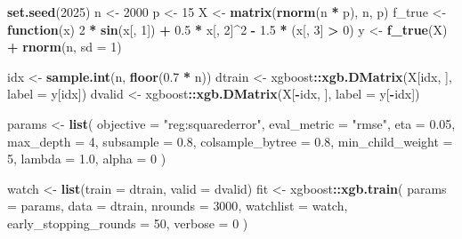 \documentclass[
]{book}
\newenvironment{Shaded}{\begin{snugshade}}{\end{snugshade}}
\newcommand{\AttributeTok}[1]{\textcolor[rgb]{0.13,0.29,0.53}{#1}}
\newcommand{\ControlFlowTok}[1]{\textcolor[rgb]{0.13,0.29,0.53}{\textbf{#1}}}
\newcommand{\DecValTok}[1]{\textcolor[rgb]{0.00,0.00,0.81}{#1}}
\newcommand{\FloatTok}[1]{\textcolor[rgb]{0.00,0.00,0.81}{#1}}
\newcommand{\FunctionTok}[1]{\textcolor[rgb]{0.13,0.29,0.53}{\textbf{#1}}}
\newcommand{\NormalTok}[1]{#1}
\newcommand{\OtherTok}[1]{\textcolor[rgb]{0.56,0.35,0.01}{#1}}
\newcommand{\SpecialCharTok}[1]{\textcolor[rgb]{0.81,0.36,0.00}{\textbf{#1}}}
\newcommand{\StringTok}[1]{\textcolor[rgb]{0.31,0.60,0.02}{#1}}
\begin{document}
\begin{Shaded}
\begin{Highlighting}[]
\FunctionTok{set.seed}\NormalTok{(}\DecValTok{2025}\NormalTok{)}
\NormalTok{n }\OtherTok{\textless{}{-}} \DecValTok{2000}
\NormalTok{p }\OtherTok{\textless{}{-}} \DecValTok{15}
\NormalTok{X }\OtherTok{\textless{}{-}} \FunctionTok{matrix}\NormalTok{(}\FunctionTok{rnorm}\NormalTok{(n }\SpecialCharTok{*}\NormalTok{ p), n, p)}
\NormalTok{f\_true }\OtherTok{\textless{}{-}} \ControlFlowTok{function}\NormalTok{(x) }\DecValTok{2} \SpecialCharTok{*} \FunctionTok{sin}\NormalTok{(x[, }\DecValTok{1}\NormalTok{]) }\SpecialCharTok{+} \FloatTok{0.5} \SpecialCharTok{*}\NormalTok{ x[, }\DecValTok{2}\NormalTok{]}\SpecialCharTok{\^{}}\DecValTok{2} \SpecialCharTok{{-}} \FloatTok{1.5} \SpecialCharTok{*}\NormalTok{ (x[, }\DecValTok{3}\NormalTok{] }\SpecialCharTok{\textgreater{}} \DecValTok{0}\NormalTok{)}
\NormalTok{y }\OtherTok{\textless{}{-}} \FunctionTok{f\_true}\NormalTok{(X) }\SpecialCharTok{+} \FunctionTok{rnorm}\NormalTok{(n, }\AttributeTok{sd =} \DecValTok{1}\NormalTok{)}

\NormalTok{idx }\OtherTok{\textless{}{-}} \FunctionTok{sample.int}\NormalTok{(n, }\FunctionTok{floor}\NormalTok{(}\FloatTok{0.7} \SpecialCharTok{*}\NormalTok{ n))}
\NormalTok{dtrain }\OtherTok{\textless{}{-}}\NormalTok{ xgboost}\SpecialCharTok{::}\FunctionTok{xgb.DMatrix}\NormalTok{(X[idx, ], }\AttributeTok{label =}\NormalTok{ y[idx])}
\NormalTok{dvalid }\OtherTok{\textless{}{-}}\NormalTok{ xgboost}\SpecialCharTok{::}\FunctionTok{xgb.DMatrix}\NormalTok{(X[}\SpecialCharTok{{-}}\NormalTok{idx, ], }\AttributeTok{label =}\NormalTok{ y[}\SpecialCharTok{{-}}\NormalTok{idx])}

\NormalTok{params }\OtherTok{\textless{}{-}} \FunctionTok{list}\NormalTok{(}
  \AttributeTok{objective =} \StringTok{"reg:squarederror"}\NormalTok{,}
  \AttributeTok{eval\_metric =} \StringTok{"rmse"}\NormalTok{,}
  \AttributeTok{eta =} \FloatTok{0.05}\NormalTok{,}
  \AttributeTok{max\_depth =} \DecValTok{4}\NormalTok{,}
  \AttributeTok{subsample =} \FloatTok{0.8}\NormalTok{,}
  \AttributeTok{colsample\_bytree =} \FloatTok{0.8}\NormalTok{,}
  \AttributeTok{min\_child\_weight =} \DecValTok{5}\NormalTok{,}
  \AttributeTok{lambda =} \FloatTok{1.0}\NormalTok{,}
  \AttributeTok{alpha =} \DecValTok{0}
\NormalTok{)}

\NormalTok{watch }\OtherTok{\textless{}{-}} \FunctionTok{list}\NormalTok{(}\AttributeTok{train =}\NormalTok{ dtrain, }\AttributeTok{valid =}\NormalTok{ dvalid)}
\NormalTok{fit }\OtherTok{\textless{}{-}}\NormalTok{ xgboost}\SpecialCharTok{::}\FunctionTok{xgb.train}\NormalTok{(}
  \AttributeTok{params =}\NormalTok{ params,}
  \AttributeTok{data =}\NormalTok{ dtrain,}
  \AttributeTok{nrounds =} \DecValTok{3000}\NormalTok{,}
  \AttributeTok{watchlist =}\NormalTok{ watch,}
  \AttributeTok{early\_stopping\_rounds =} \DecValTok{50}\NormalTok{,}
  \AttributeTok{verbose =} \DecValTok{0}
\NormalTok{)}
\end{Highlighting}
\end{Shaded}
\end{document}
